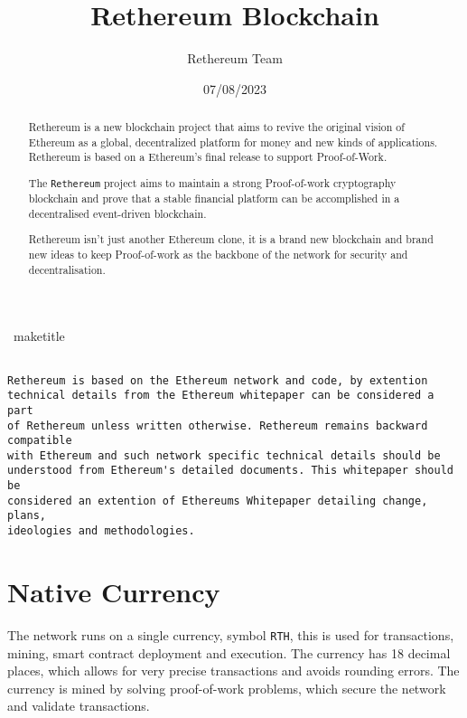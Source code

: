 \documentclass[a4paper,onecolumn, superscriptaddress,10pt,accepted=2020-05-01,issue=1, volume=2, shorttitle=papers]{compositionalityarticle}
\begin{document}
\title{Rethereum Blockchain}
\date{07/08/2023}
\author{Rethereum Team}

\   maketitle

\begin{abstract}
     
     Rethereum is a new blockchain project that aims to revive the original vision of Ethereum as a global, decentralized platform for money and new kinds of applications. Rethereum is based on a Ethereum's final release to support Proof-of-Work.
     
     The \texttt{Rethereum} project aims to maintain a strong Proof-of-work cryptography blockchain and prove that  a stable financial platform can be accomplished in a decentralised event-driven blockchain.
    
    Rethereum isn't just another Ethereum clone, it is a brand new blockchain and brand new ideas to keep Proof-of-work as the backbone of the network for security and decentralisation. 
    
\end{abstract}

\vspace{10cm}

\begin{verbatim}

Rethereum is based on the Ethereum network and code, by extention 
technical details from the Ethereum whitepaper can be considered a part 
of Rethereum unless written otherwise. Rethereum remains backward compatible 
with Ethereum and such network specific technical details should be 
understood from Ethereum's detailed documents. This whitepaper should be 
considered an extention of Ethereums Whitepaper detailing change, plans, 
ideologies and methodologies.
\end{verbatim}


\newpage

\section{Native Currency}

The network runs on a single currency, symbol \texttt{RTH}, this is used for transactions, mining, smart contract deployment and execution. The currency has 18 decimal places, which allows for very precise transactions and avoids rounding errors. The currency is mined by solving proof-of-work problems, which secure the network and validate transactions. 
\end{document}
